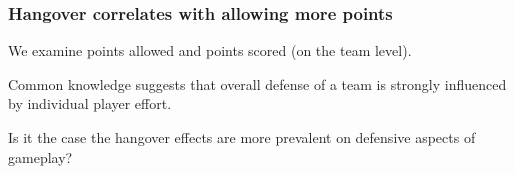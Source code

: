 \documentclass{beamer}
\begin{document}

\begin{frame}   \frametitle{Hangover correlates with allowing more points}
  We examine points allowed and points scored (on the team level).

  \vspace{12pt}Common knowledge suggests that overall defense of a team is strongly influenced by individual player effort.

  \vspace{12pt}Is it the case the hangover effects are more prevalent on defensive aspects of gameplay? \end{frame}
\end{document}
